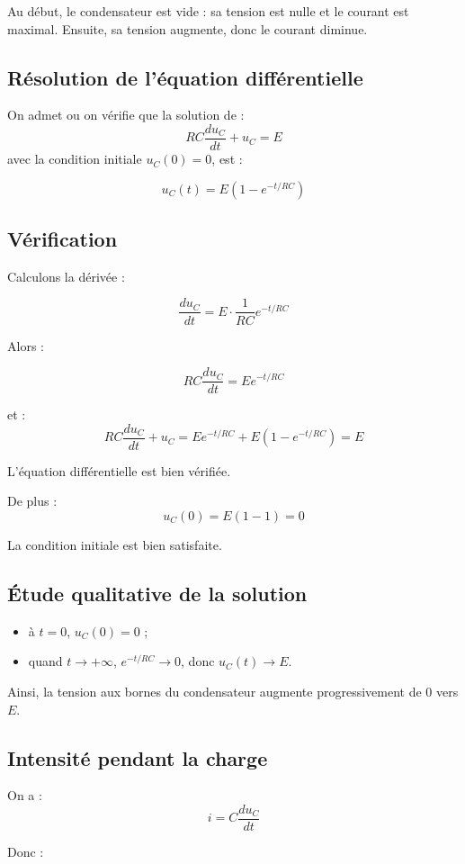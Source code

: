 \documentclass[11pt,a4paper]{article}
\begin{document}
Au début, le condensateur est vide : sa tension est nulle et le courant est maximal. Ensuite, sa tension augmente, donc le courant diminue.

\subsection{Résolution de l'équation différentielle}

On admet ou on vérifie que la solution de :
\[
RC \frac{du_C}{dt} + u_C = E
\]
avec la condition initiale \(u_C(0)=0\), est :

\[
u_C(t)=E\left(1-e^{-t/RC}\right)
\]

\subsection{Vérification}

Calculons la dérivée :

\[
\frac{du_C}{dt} = E \cdot \frac{1}{RC} e^{-t/RC}
\]

Alors :

\[
RC\frac{du_C}{dt} = E e^{-t/RC}
\]

et :
\[
RC\frac{du_C}{dt} + u_C = E e^{-t/RC} + E(1-e^{-t/RC}) = E
\]

L'équation différentielle est bien vérifiée.

De plus :
\[
u_C(0)=E(1-1)=0
\]

La condition initiale est bien satisfaite.

\subsection{Étude qualitative de la solution}

\begin{itemize}
    \item à \(t=0\), \(u_C(0)=0\) ;
    \item quand \(t\to +\infty\), \(e^{-t/RC}\to 0\), donc \(u_C(t)\to E\).
\end{itemize}

Ainsi, la tension aux bornes du condensateur augmente progressivement de \(0\) vers \(E\).

\subsection{Intensité pendant la charge}

On a :
\[
i = C \frac{du_C}{dt}
\]

Donc :
\end{document}
